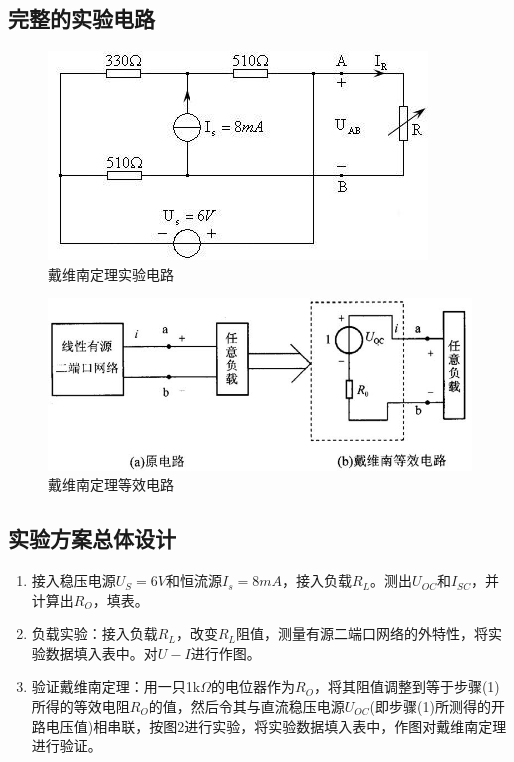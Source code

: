 \documentclass{../source/Experiment}
\begin{document}
        \subsection{完整的实验电路}
            \begin{figure}[htbp]
                \begin{center}
                    \includegraphics[scale=0.8]{pic/pic3.png}
                    \caption{戴维南定理实验电路}
                \end{center}
            \end{figure}
                \newpage
            \begin{figure}[htbp]
                \begin{center}
                    \includegraphics[scale=0.8]{pic/pic4.jpg}
                    \caption{戴维南定理等效电路}
                \end{center}
            \end{figure}
        \subsection{实验方案总体设计}
            \begin{enumerate}
                \item 接入稳压电源$U_S = 6V$和恒流源$I_s = 8mA$，接入负载$R_L$。测出$U_{OC}$和$I_{SC}$，并计算出$R_O$，填表。
                \item 负载实验：接入负载$R_L$，改变$R_L$阻值，测量有源二端口网络的外特性，将实验数据填入表中。对$U-I$进行作图。
                \item 验证戴维南定理：用一只1k$\Omega$的电位器作为$R_O$，将其阻值调整到等于步骤(1)所得的等效电阻$R_O$的值，然后令其与直流稳压电源$U_{OC}$(即步骤(1)所测得的开路电压值)相串联，按图2进行实验，将实验数据填入表中，作图对戴维南定理进行验证。
            \end{enumerate}
\end{document}
